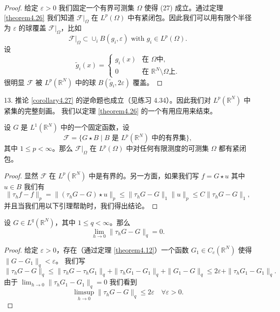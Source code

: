 \begin{proof}
给定 $\varepsilon > 0$ 我们固定一个有界可测集 $\Omega$ 使得 (27) 成立。通过定理 \ref{theorem4.26} 我们知道 $\mathcal{F}|_\Omega$ 在 $L^p(\Omega)$ 中有紧闭包。因此我们可以用有限个半径为 $\varepsilon$ 的球覆盖 $\mathcal{F}|_\Omega$，比如
\[ \mathcal{F}|_\Omega \subset \cup_i B(g_i, \varepsilon) \text{ with } g_i \in L^p(\Omega). \]
设
\[ \tilde{g}_i(x) = \begin{cases} g_i(x) & \text{在 } \Omega \text{中}, \\ 0 & \text{在 } \mathbb{R}^N \setminus \Omega \text{上}. \end{cases} \]
很明显 $\mathcal{F}$ 被 $L^p(\mathbb{R}^N)$ 中的球 $B(\tilde{g}_i, 2\varepsilon)$ 覆盖。
\end{proof}

\begin{remark}
13. 推论 \ref{corollary4.27} 的逆命题也成立（见练习 4.34）。因此我们对 $L^p(\mathbb{R}^N)$ 中紧集的完整刻画。
我们以定理 \ref{theorem4.26} 的一个有用应用来结束。
\end{remark}

\begin{corollary}\label{corollary4.28}
设 $G$ 是 $L^1(\mathbb{R}^N)$ 中的一个固定函数，设
\[ \mathcal{F} = \{G \star B \mid B \text{ 是 } L^p(\mathbb{R}^N) \text{ 中的有界集}\}, \]
其中 $1 \le p < \infty$。那么 $\mathcal{F}|_\Omega$ 在 $L^p(\Omega)$ 中对任何有限测度的可测集 $\Omega$ 都有紧闭包。
\end{corollary}

\begin{proof}
显然 $\mathcal{F}$ 在 $L^p(\mathbb{R}^N)$ 中是有界的。另一方面，如果我们写 $f=G\star u$ 其中 $u \in B$ 我们有
\[ \|\tau_h f - f\|_p = \|(\tau_h G - G) \star u\|_p \le \|\tau_h G - G\|_1 \|u\|_p \le C \|\tau_h G - G\|_1, \]
并且当我们用以下引理帮助时，我们得出结论。
\end{proof}

\begin{lemma}\label{lemma4.3}
设 $G \in L^q(\mathbb{R}^N)$，其中 $1 \le q < \infty$。那么
\[ \lim_{h \to 0} \|\tau_h G - G\|_q = 0. \]
\end{lemma}
\begin{proof}
给定 $\varepsilon > 0$，存在（通过定理 \ref{theorem4.12}）一个函数 $G_1 \in C_c(\mathbb{R}^N)$ 使得 $\|G-G_1\|_q < \varepsilon$。
我们写
\[ \|\tau_h G - G\|_q \le \|\tau_h G - \tau_h G_1\|_q + \|\tau_h G_1 - G_1\|_q + \|G_1 - G\|_q \le 2\varepsilon + \|\tau_h G_1 - G_1\|_q. \]
由于 $\lim_{h \to 0} \|\tau_h G_1 - G_1\|_q = 0$ 我们看到
\[ \limsup_{h\to 0} \|\tau_h G - G\|_q \le 2\varepsilon \quad \forall \varepsilon > 0. \]
\end{proof}

